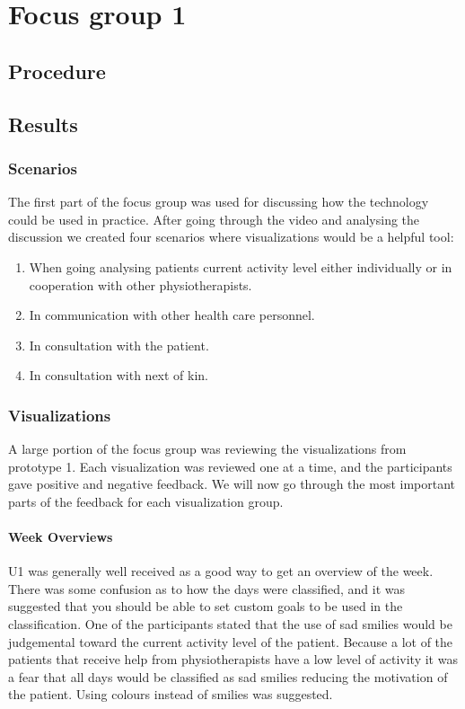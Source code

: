 \chapter{Focus group 1}

\section{Procedure}

\section{Results}

\subsection{Scenarios}
The first part of the focus group was used for discussing how the technology could be used in practice. After going through the video and analysing the discussion we created four scenarios where visualizations would be a helpful tool: 
\vspace{-6mm}
\begin{enumerate}
\item When going analysing patients current activity level either individually or in cooperation with other physiotherapists.
\item In communication with other health care personnel.
\item In consultation with the patient.
\item In consultation with next of kin.
\end{enumerate}

\subsection{Visualizations}
A large portion of the focus group was reviewing the visualizations from prototype 1. Each visualization was reviewed one at a time, and the participants gave positive and negative feedback. We will now go through the most important parts of the feedback for each visualization group.

\subsubsection{Week Overviews}
U1 was generally well received as a good way to get an overview of the week. There was some confusion as to how the days were classified, and it was suggested that you should be able to set custom goals to be used in the classification. One of the participants stated that the use of sad smilies would be judgemental toward the current activity level of the patient. Because a lot of the patients that receive help from physiotherapists have a low level of activity it was a fear that all days would be classified as sad smilies reducing the motivation of the patient. Using colours instead of smilies was suggested.

